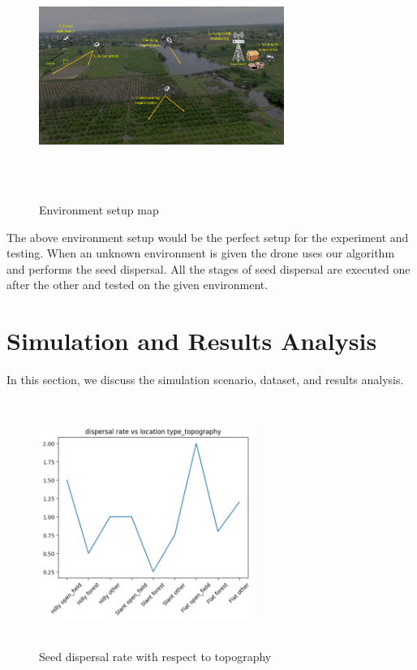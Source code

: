 \documentclass[pmlr,twocolumn,10pt]{jmlr}
\begin{document}
\begin{figure}[htp]
    \centering
    \includegraphics[width=8cm,height=8cm]{hornbill.png}
    \caption{Environment setup map}
    \label{fig:galaxy}
\end{figure}

The above environment setup would be the perfect setup for the experiment and testing. When an unknown environment is given the drone uses our algorithm and performs the seed dispersal. All the stages of seed dispersal are executed one after the other and tested on the given environment.


\section{Simulation and Results Analysis}
In this section, we discuss the simulation scenario, dataset, and results analysis.

\begin{figure}[htp]
    \centering
    \includegraphics[width=7cm,height=8cm]{download (1).png}
    \caption{Seed dispersal rate with respect to topography}
    \label{fig:galaxy}
\end{figure}
\end{document}
